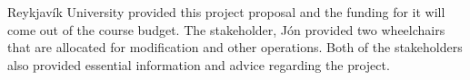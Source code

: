 \documentclass[showtrims]{rubook}
\begin{document}
Reykjavík University provided this project proposal and the funding for it will come out of the course budget. The stakeholder, Jón provided two wheelchairs that are allocated for modification and other operations. Both of the stakeholders also provided essential information and advice regarding the project.


\clearpage{}

\mainmatter{}












\appendix{}%



\clearforchapter{}
\printindex{}%
\end{document}
